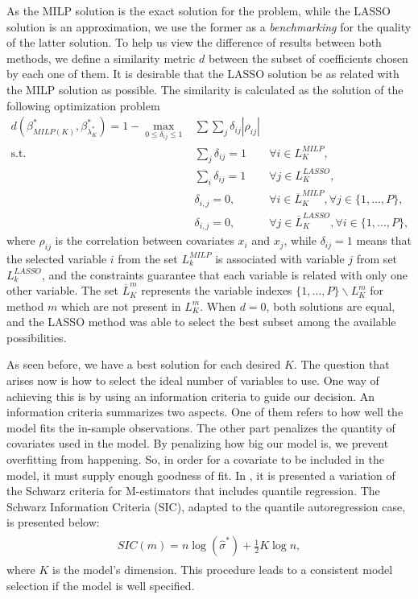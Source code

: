 As the MILP solution is the exact solution for the problem, while the LASSO solution is an approximation, we use the former as a \textit{benchmarking} for the quality of the latter solution. To help us view the difference of results between both methods, we define a similarity metric $d$ between the subset of coefficients chosen by each one of them. It is desirable that the LASSO solution be as related with the MILP solution as possible.
The similarity is calculated as the solution of the following optimization problem
\begin{eqnarray}
d(\beta^*_{MILP(K)}, \beta^*_{\lambda^*_K}) =	1 - \max_{0\leq\delta_{ij}\leq1} & \sum\sum_{j} \delta_{ij} |\rho_{ij}| \label{eq:metricad0} \\
\text{s.t.} & \sum_{j}\delta_{ij}=1 & \forall i\in L_{K}^{MILP},\\
& \sum_{i}\delta_{ij}=1 & \forall j\in L_{K}^{LASSO},\\
& \delta_{i,j} = 0, & \forall i \in \overline{L}_{K}^{MILP}, \forall j \in \{1,\dots,P\},\\
& \delta_{i,j} = 0, & \forall j \in \overline{L}_{K}^{LASSO}, \forall i \in \{1,\dots,P\},\label{eq:metricad4}
\end{eqnarray}
where $\rho_{ij}$ is the correlation between covariates $x_i$ and $x_j$, while $\delta_{ij} = 1$ means that the selected variable $i$ from the set $L_k^{MILP}$ is associated with variable $j$ from set $L_k^{LASSO}$, and the constraints guarantee that each variable is related with only one other variable. The set $\overline{L}_K^{m}$ represents the variable indexes $\{1,\dots,P\} \backslash {L}_K^{m}$ for method $m$ which are not present in ${L}_K^{m}$.
When $d = 0$, both solutions are equal, and the LASSO method was able to select the best subset among the available possibilities.




As seen before, we have a best solution for each desired $K$. The question that arises now is how to select the ideal number of variables to use.
One way of achieving this is by using an information criteria to guide our decision. 
An information criteria summarizes two aspects. One of them refers to how well the model fits the in-sample observations. The other part penalizes the quantity of covariates used in the model. By penalizing how big our model is, we prevent overfitting from happening. So, in order for a covariate to be included in the model, it must supply enough goodness of fit.
In \cite{machado1993robust}, it is presented a variation of the Schwarz criteria for M-estimators that includes quantile regression. The Schwarz Information Criteria (SIC), adapted to the quantile autoregression case, is presented below:
\begin{align} 
\begin{split}
SIC(m) = n \log(\hat{\sigma}^*)+\frac{1}{2}K\log n,\label{eq:SIC}
\end{split}					
\end{align}
where $K$ is the model's dimension. This procedure leads to a consistent model selection if the model is well specified. 

